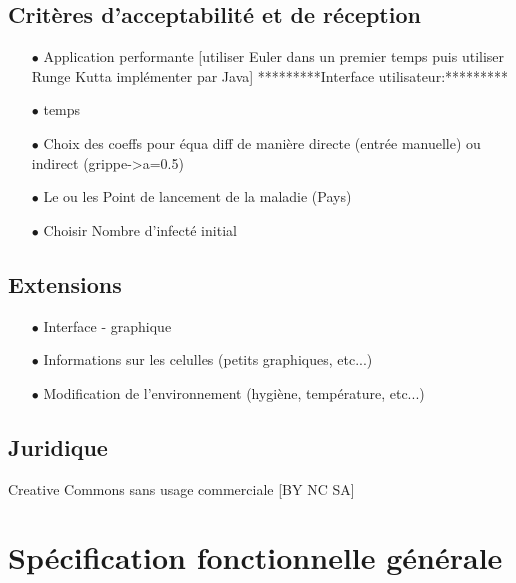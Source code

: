 \documentclass[12pt,a4paper]{report}
\begin{document}
\subsection*{Critères d'acceptabilité et de réception}
\begin{flushleft}
  \begin{itemize}
	\item[$\bullet$] Application performante [utiliser Euler dans un premier temps puis utiliser Runge Kutta implémenter par Java]
*********Interface utilisateur:*********
	\item[$\bullet$] temps 
	\item[$\bullet$] Choix des coeffs pour équa diff de manière directe (entrée manuelle) ou indirect (grippe->a=0.5)
	\item[$\bullet$] Le ou les Point de lancement de la maladie (Pays) 
	\item[$\bullet$] Choisir Nombre d'infecté initial
  \end{itemize}
\end{flushleft}

\subsection*{Extensions}
\begin{flushleft}
  \begin{itemize}
	\item[$\bullet$] Interface - graphique 
	\item[$\bullet$] Informations sur les celulles (petits graphiques, etc...) 
	\item[$\bullet$] Modification de l'environnement (hygiène, température, etc...) 
  \end{itemize}
\end{flushleft}

\subsection*{Juridique}
\begin{flushleft}
Creative Commons sans usage commerciale [BY NC SA]
\end{flushleft}

\section*{Spécification fonctionnelle générale}
\end{document}
